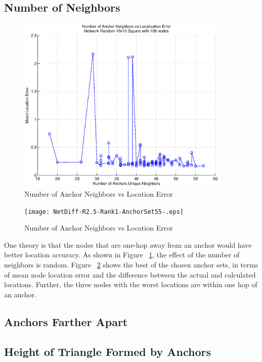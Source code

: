 \subsection{Number of Neighbors}
\begin{figure}
  \centering
    \includegraphics[width=4in]{figures/AnchorNeighborsVsError-Random-10x10-Square-with-100-nodes.eps}
    \caption{Number of Anchor Neighbors vs Location Error}
    \label{fig:Neighbors1}
\end{figure}

\begin{figure}
  \centering
    \texttt{[image: NetDiff-R2.5-Rank1-AnchorSet55-.eps]}
    \caption{Number of Anchor Neighbors vs Location Error}
    \label{fig:Neighbors1Network}
\end{figure}

One theory is that the nodes that are one-hop away from an anchor would have better location accuracy.  As shown in Figure ~\ref{fig:Neighbors1}, the effect of the number of neighbors is random.  Figure ~\ref{fig:Neighbors1Network} shows the best of the chosen anchor sets, in terms of mean node location error and the difference between the actual and calculated locations.  Further, the three nodes with the worst locations are within one hop of an anchor.


\subsection{Anchors Farther Apart}


\subsection{Height of Triangle Formed by Anchors}

